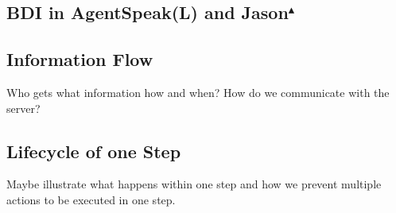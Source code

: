\subsection[BDI in AgentSpeak(L) and Jason]{BDI in AgentSpeak(L) and Jason$^{\blacktriangle}$}

\subsection{Information Flow}
Who gets what information how and when? How do we communicate with the server?
\subsection{Lifecycle of one Step}
Maybe illustrate what happens within one step and how we prevent multiple actions to be executed in one step.
